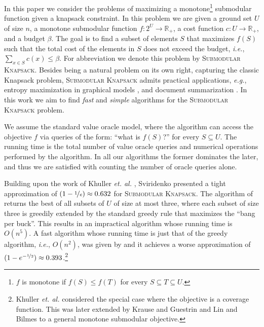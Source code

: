 \documentclass[a4paper,UKenglish,cleveref, autoref]{lipics-v2019}
\newcommand{\SK}{{\textsc{Submodular Knapsack}}\xspace}
\begin{document}
In this paper we consider the problems of maximizing a monotone\footnote{
    $f$ is monotone if $f(S) \leq f(T)$ for every $S \subseteq T \subseteq U$.
} submodular function given a knapsack constraint.
In this problem we are given a ground set
$U$ of size $n$, a monotone submodular function $f:2^U \to \mathbb{R}_+$, a cost function $c:U \to \mathbb{R}_+$, and a budget $\beta$.
The goal is to find a subset of elements $S$ that maximizes $f(S)$ such that the total cost of the elements in $S$ does not exceed the budget, {\em i.e.}, $\sum _{x\in S}c(x)\leq \beta$.
For abbreviation we denote this problem by \SK.
Besides being a natural problem on its own right, capturing the classic Knapsack problem, \SK admits practical applications, {\em e.g.}, entropy maximization in graphical models \cite{krause2005note}, and document summarization \cite{LB10}.
In this work we aim to find {\em fast} and {\em simple} algorithms for the \SK problem.

We assume the standard value oracle model, where the algorithm can access the objective $f$ via queries of the form: ``what is $f(S)$?'' for every $S\subseteq U$.
The running time is the total number of value oracle queries and numerical operations performed by the algorithm. In all our algorithms the former dominates the later, and thus we are satisfied with counting the number of oracle queries alone.

Building upon the work of Khuller {\em et. al.} \cite{khuller1999budgeted}, Sviridenko \cite{sviridenko2004note} presented a tight approximation of $(1-\nicefrac[]{1}{e})\approx 0.632$ for \SK.
The algorithm of \cite{sviridenko2004note} returns the best of all subsets of $U$ of size at most three, where each subset of size three is greedily extended by the standard greedy rule that maximizes the ``bang per buck''.
This results in an impractical algorithm whose running time is $O(n^5)$.
A fast algorithm whose running time is just that of the greedy algorithm, {\em i.e.}, $O(n^2)$, was given by \cite{khuller1999budgeted} and it achieves a worse approximation of $(1-e^{-\nicefrac[]{1}{2}})\approx 0.393$.\footnote{Khuller {\em et. al.} \cite{khuller1999budgeted} considered the special case where the objective is a coverage function. This was later extended by Krause and Guestrin \cite{krause2005note} and Lin and Bilmes \cite{LB10} to a general monotone submodular objective.}
\end{document}
